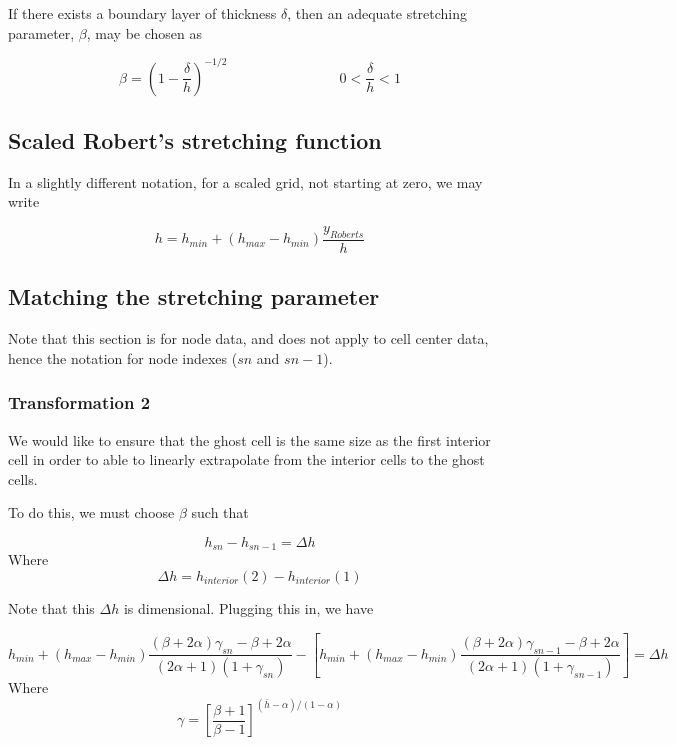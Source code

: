 \documentclass[11pt]{article}
\begin{document}
If there exists a boundary layer of thickness $\delta$, then an adequate stretching parameter, $\beta$, may be chosen as

\begin{equation}
	\beta = \left( 1 - \frac{\delta}{h} \right)^{-1/2}
	\qquad \qquad
	\qquad \qquad
	0 < \frac{\delta}{h} < 1
\end{equation}


\subsection{Scaled Robert's stretching function}
In a slightly different notation, for a scaled grid, not starting at zero, we may write

\begin{equation}
	h = h_{min} + (h_{max}-h_{min}) \frac{y_{Roberts}}{h}
\end{equation}

\subsection{Matching the stretching parameter}
Note that this section is for node data, and does not apply to cell center data, hence the notation for node indexes ($sn$ and $sn-1$).

\subsubsection{Transformation 2}
We would like to ensure that the ghost cell is the same size as the first interior cell in order to able to linearly extrapolate from the interior cells to the ghost cells.

To do this, we must choose $\beta$ such that

\begin{equation}
	h_{sn} - h_{sn-1} = \Delta h
\end{equation}
Where
\begin{equation}
	\Delta h = h_{interior}(2) - h_{interior}(1)
\end{equation}

Note that this $\Delta h$ is dimensional. Plugging this in, we have

\begin{equation}
	h_{min} + (h_{max}-h_{min}) \frac{(\beta+2\alpha)\gamma_{sn} - \beta + 2\alpha}{(2\alpha+1)(1+\gamma_{sn})}
	-
	\left[
	h_{min} + (h_{max}-h_{min}) \frac{(\beta+2\alpha)\gamma_{sn-1} - \beta + 2\alpha}{(2\alpha+1)(1+\gamma_{sn-1})}
	\right]
	=
	\Delta h
\end{equation}
Where
\begin{equation}
	\gamma = \left[ \frac{\beta+1}{\beta-1} \right]^{(\bar{h}-\alpha)/(1-\alpha)}
\end{equation}
\end{document}

